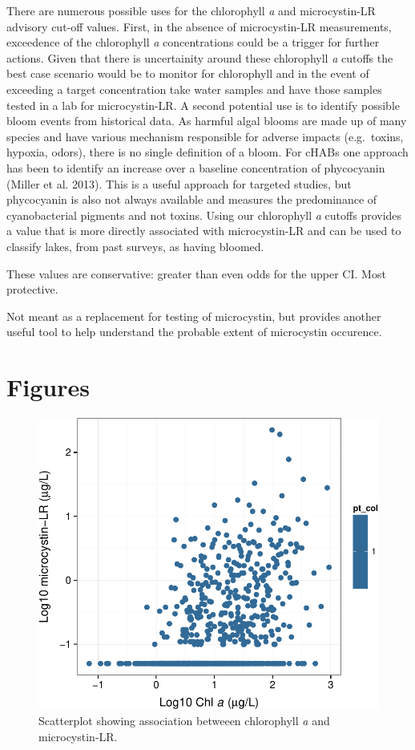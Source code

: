 \documentclass[11pt,]{article}
\begin{document}
There are numerous possible uses for the chlorophyll \emph{a} and
microcystin-LR advisory cut-off values. First, in the absence of
microcystin-LR measurements, exceedence of the chlorophyll \emph{a}
concentrations could be a trigger for further actions. Given that there
is uncertainity around these chlorophyll \emph{a} cutoffs the best case
scenario would be to monitor for chlorophyll and in the event of
exceeding a target concentration take water samples and have those
samples tested in a lab for microcystin-LR. A second potential use is to
identify possible bloom events from historical data. As harmful algal
blooms are made up of many species and have various mechanism
responsible for adverse impacts (e.g.~toxins, hypoxia, odors), there is
no single definition of a bloom. For cHABs one approach has been to
identify an increase over a baseline concentration of phycocyanin
(Miller et al. 2013). This is a useful approach for targeted studies,
but phycocyanin is also not always available and measures the
predominance of cyanobacterial pigments and not toxins. Using our
chlorophyll \emph{a} cutoffs provides a value that is more directly
associated with microcystin-LR and can be used to classify lakes, from
past surveys, as having bloomed.

These values are conservative: greater than even odds for the upper CI.
Most protective.

Not meant as a replacement for testing of microcystin, but provides
another useful tool to help understand the probable extent of
microcystin occurence.

\newpage

\section{Figures}\label{figures}

\begin{figure}[htbp]
\centering
\includegraphics{manuscript_files/figure-latex/chla_micro_scatter-1.pdf}
\caption{Scatterplot showing association betweeen chlorophyll \textit{a}
and microcystin-LR. \label{fig:chla_micro_scatter}}
\end{figure}
\end{document}
